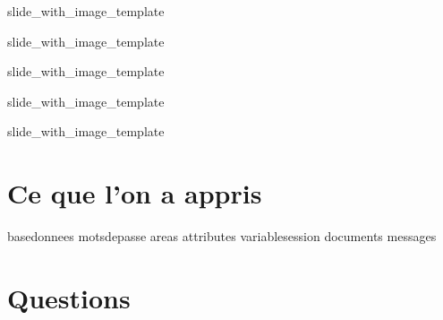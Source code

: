 \documentclass{beamer}
\begin{document}
\def\titlename{Team}
\def\imagepath{images/database/Team.png}
 {slide_with_image_template}

\def\titlename{Task}
\def\imagepath{images/database/Task.png}
 {slide_with_image_template}

\def\titlename{Event}
\def\imagepath{images/database/Event.png}
 {slide_with_image_template}

\def\titlename{Document}
\def\imagepath{images/database/Document.png}
 {slide_with_image_template}

\def\titlename{Message}
\def\imagepath{images/database/Message.png}
 {slide_with_image_template}

\section{Ce que l'on a appris}
 {basedonnees}
 {motsdepasse}
 {areas}
 {attributes}
 {variablesession}
 {documents}
 {messages}



\section{Questions}

\end{document}
